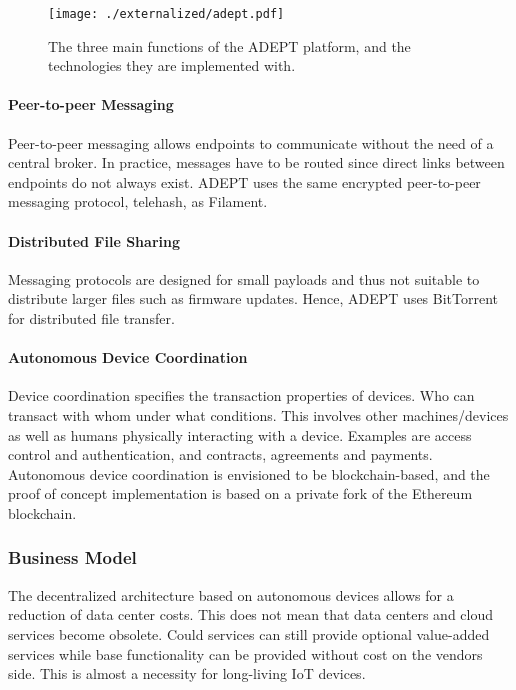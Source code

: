 \begin{figure}
\centering
\texttt{[image: ./externalized/adept.pdf]}
\caption{The three main functions of the ADEPT platform, and the technologies they are implemented with.}
\label{fig:adept}
\end{figure}

\paragraph{Peer-to-peer Messaging}

Peer-to-peer messaging allows endpoints to communicate without the need of a central broker. In practice, messages have to be routed since direct links between endpoints do not always exist. ADEPT uses the same encrypted peer-to-peer messaging protocol, telehash, as Filament. 

\paragraph{Distributed File Sharing}

Messaging protocols are designed for small payloads and thus not suitable to distribute larger files such as firmware updates. Hence, ADEPT uses BitTorrent for distributed file transfer.

\paragraph{Autonomous Device Coordination}
Device coordination specifies the transaction properties of devices. Who can transact with whom under what conditions. This involves other machines/devices as well as humans physically interacting with a device. Examples are access control and authentication, and contracts, agreements and payments. Autonomous device coordination is envisioned to be blockchain-based, and the proof of concept implementation is based on a private fork of the Ethereum blockchain. 

\subsubsection{Business Model}

The decentralized architecture based on autonomous devices allows for a reduction of data center costs. This does not mean that data centers and cloud services become obsolete. Could services can still provide optional value-added services while base functionality can be provided without cost on the vendors side. This is almost a necessity for long-living IoT devices.


